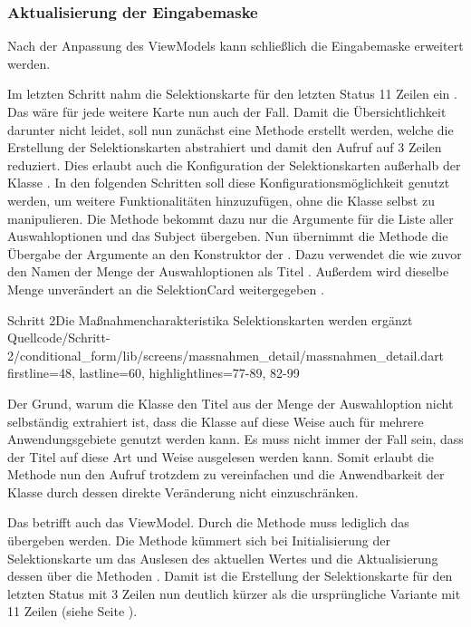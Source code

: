 \subsubsection{Aktualisierung der Eingabemaske}

Nach der Anpassung des ViewModels kann schließlich die Eingabemaske erweitert werden.

Im letzten Schritt nahm die Selektionskarte für den letzten Status 11 Zeilen ein . 
Das wäre für jede weitere Karte nun auch der Fall.
Damit die Übersichtlichkeit darunter nicht leidet, soll nun zunächst eine Methode erstellt werden, welche die Erstellung der Selektionskarten abstrahiert und damit den Aufruf auf 3 Zeilen reduziert.
Dies erlaubt auch die Konfiguration der Selektionskarten außerhalb der Klasse .
In den folgenden Schritten soll diese Konfigurationsmöglichkeit genutzt werden, um weitere Funktionalitäten hinzuzufügen, ohne die Klasse selbst zu manipulieren.
Die Methode  bekommt dazu nur die Argumente für die Liste aller Auswahloptionen   und das Subject   übergeben.
Nun übernimmt die Methode die Übergabe der Argumente an den Konstruktor der .
Dazu verwendet die  wie zuvor den Namen der Menge der Auswahloptionen als Titel .
Außerdem wird dieselbe Menge unverändert an die SelektionCard weitergegeben .

\begin{alexlisting}{Schritt 2}{Die Maßnahmencharakteristika Selektionskarten werden ergänzt}
  {Quellcode/Schritt-2/conditional_form/lib/screens/massnahmen_detail/massnahmen_detail.dart}
  {firstline=48, lastline=60, highlightlines={77-89, 82-99}}
  \label{lst:Schritt2MassnahmencharakteristikaSelektionskartenWerdenErgaenzt}
\end{alexlisting}

Der Grund, warum die Klasse  den Titel aus der Menge der Auswahloption nicht selbständig extrahiert ist, dass die Klasse auf diese Weise auch für mehrere Anwendungsgebiete genutzt werden kann.
Es muss nicht immer der Fall sein, dass der Titel auf diese Art und Weise ausgelesen werden kann.
Somit erlaubt die Methode  nun den Aufruf trotzdem zu vereinfachen und die Anwendbarkeit der Klasse  durch dessen direkte Veränderung nicht einzuschränken.

Das betrifft auch das ViewModel. Durch die Methode  muss lediglich das  übergeben werden. Die Methode kümmert sich bei Initialisierung der Selektionskarte um das Auslesen des aktuellen Wertes  und die Aktualisierung dessen über die Methoden     . Damit ist die Erstellung der Selektionskarte für den letzten Status mit 3 Zeilen \Lst{\ref{lst:Schritt2BuildSelectionCardLetzterStatusChoices}} nun deutlich kürzer als die ursprüngliche Variante mit 11 Zeilen (siehe Seite \pageref{lst:Schritt1AusgabeDerFormularfelder}).

